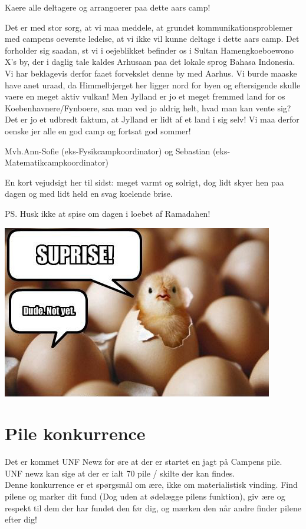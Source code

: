 \begin{minipage}[b]{0.95\linewidth}
\begin{minipage}[t]{0.47\textwidth}
Kaere alle deltagere og arrangoerer paa dette aars camp!

Det er med stor sorg, at vi maa meddele, at grundet kommunikationsproblemer med campens oeverste ledelse, at vi ikke vil kunne deltage i dette aars camp. 
Det forholder sig saadan, st vi i oejeblikket befinder os i Sultan Hamengkoeboewono X's by, der i daglig tale kaldes Arhusaan paa det lokale sprog Bahasa Indonesia. 
Vi har beklagevis derfor faaet forvekslet denne by med Aarhus. Vi burde maaske have anet uraad, da Himmelbjerget her ligger nord for byen og eftersigende skulle vaere en meget aktiv vulkan! Men Jylland er jo et meget fremmed land for os Koebenhavnere/Fynboere, saa man ved jo aldrig helt, hvad man kan vente sig? Det er jo et udbredt faktum, at Jylland er lidt af et land i sig selv!
Vi maa derfor oenske jer alle en god camp og fortsat god sommer!

Mvh.Ann-Sofie (eks-Fysikcampkoordinator) og Sebastian (eks-Matematikcampkoordinator)

En kort vejudsigt her til sidst: meget varmt og solrigt, dog lidt skyer hen paa dagen og med lidt held en svag koelende brise.

PS. Husk ikke at spise om dagen i loebet af Ramadahen!

\vspace{2mm}

\includegraphics[width=\linewidth]{suprise.jpg}

\vspace{-2mm}
\section*{Pile konkurrence}
Det er kommet UNF Newz for øre at der er startet en jagt på Campens pile. UNF newz kan sige at der er ialt 70 pile / skilte der kan findes. \\
Denne konkurrence er et spørgsmål om ære, ikke om materialistisk vinding. Find pilene og marker dit fund (Dog uden at ødelægge pilens funktion), giv ære og respekt til dem der har fundet den før dig, og mærken den når andre finder pilene efter dig!



\end{minipage}
\end{minipage}
